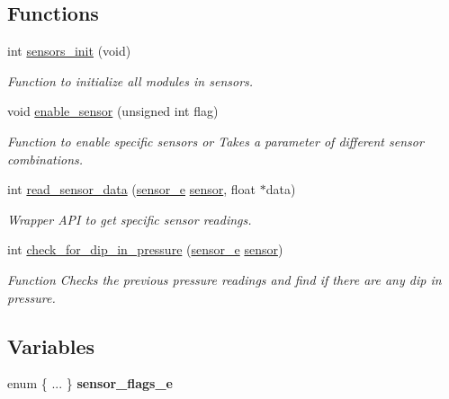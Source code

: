 \subsection*{Functions}
\begin{DoxyCompactItemize}
\item 
int \hyperlink{group___base_sensors_module_ga5671eda6cef44f562fc5546701bad52b}{sensors\+\_\+init} (void)
\begin{DoxyCompactList}\small\item\em Function to initialize all modules in sensors. \end{DoxyCompactList}\item 
void \hyperlink{group___base_sensors_module_ga882a0452720480e06504493292f2f0e2}{enable\+\_\+sensor} (unsigned int flag)
\begin{DoxyCompactList}\small\item\em Function to enable specific sensors or Takes a parameter of different sensor combinations. \end{DoxyCompactList}\item 
int \hyperlink{group___base_sensors_module_gae8aa32a2ceb9ce2a8dc6d9df9ef8ffd2}{read\+\_\+sensor\+\_\+data} (\hyperlink{group___base_sensors_module_ga241bbfb8b20d2f411c4c10bb9703288c}{sensor\+\_\+e} \hyperlink{classsensor}{sensor}, float $\ast$data)
\begin{DoxyCompactList}\small\item\em Wrapper A\+PI to get specific sensor readings. \end{DoxyCompactList}\item 
int \hyperlink{group___base_sensors_module_gad44ae3ff179318970b2a99be7500db74}{check\+\_\+for\+\_\+dip\+\_\+in\+\_\+pressure} (\hyperlink{group___base_sensors_module_ga241bbfb8b20d2f411c4c10bb9703288c}{sensor\+\_\+e} \hyperlink{classsensor}{sensor})
\begin{DoxyCompactList}\small\item\em Function Checks the previous pressure readings and find if there are any dip in pressure. \end{DoxyCompactList}\end{DoxyCompactItemize}
\subsection*{Variables}
\begin{DoxyCompactItemize}
\item 
\mbox{\label{group___base_sensors_module_gab94b29ffe4f7354bcdd031f2d90cc2d7}} 
enum  \{ ... \}  {\bfseries sensor\+\_\+flags\+\_\+e}
\end{DoxyCompactItemize}


